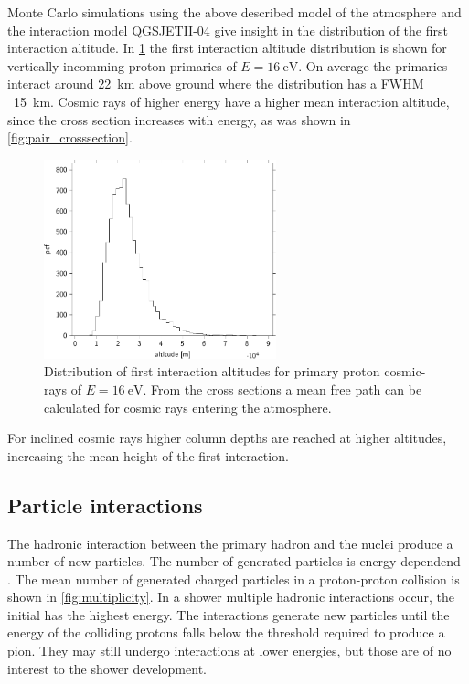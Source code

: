 Monte Carlo simulations using the above described model of the atmosphere and the interaction model QGSJETII-04 give insight in the distribution of the first interaction altitude. In \cref{fig:first_interaction_altitude} the first interaction altitude distribution is shown for vertically incomming proton primaries of $E = \SI{16}{\eV}$. On average the primaries interact around \SI{22}{\kilo\meter} above ground where the distribution has a FWHM ~\SI{15}{\kilo\meter}. Cosmic rays of higher energy have a higher mean interaction altitude, since the cross section increases with energy, as was shown in \cref{fig:pair_crosssection}.

\begin{figure}
    \centering
    \includegraphics[width=0.6\textwidth]
                    {plots/cosmic-rays/first_interaction_altitude}
    \caption{Distribution of first interaction altitudes for primary proton cosmic-rays of $E = \SI{16}{\eV}$. From the cross sections a mean free path can be calculated for cosmic rays entering the atmosphere. \cite{heck2013corsika}}
    \label{fig:first_interaction_altitude}
\end{figure}

For inclined cosmic rays higher column depths are reached at higher altitudes, increasing the mean height of the first interaction.


\subsection{Particle interactions}

The hadronic interaction between the primary hadron and the nuclei produce a number of new particles. The number of generated particles is energy dependend \cite{grieder2010eas}. The mean number of generated charged particles in a proton-proton collision is shown in \cref{fig:multiplicity}. In a shower multiple hadronic interactions occur, the initial has the highest energy. The interactions generate new particles until the energy of the colliding protons falls below the threshold required to produce a pion. They may still undergo interactions at lower energies, but those are of no interest to the shower development.

